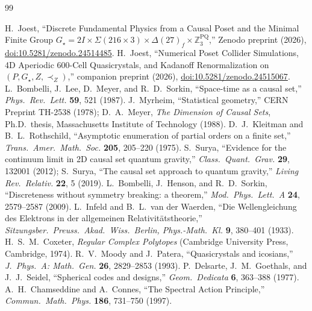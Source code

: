 \documentclass[11pt,a4paper]{article}
\theoremstyle{definition}
\theoremstyle{remark}
\newcommand{\Z}{\mathbb{Z}}
\begin{document}
\begin{thebibliography}{99}\raggedright
{} H.~Joest, ``Discrete Fundamental Physics from a Causal Poset and the Minimal Finite Group $G_\star = 2I \times \Sigma(216 \times 3) \times \Delta(27)_f \times \Z_3^{\mathrm{PQ}}$,'' Zenodo preprint (2026), \href{https://doi.org/10.5281/zenodo.24514485}{doi:10.5281/zenodo.24514485}.
 H.~Joest, ``Numerical Poset Collider Simulations, 4D Aperiodic $600$-Cell Quasicrystals, and Kadanoff Renormalization on $(P, G_\star, Z, \prec_Z)$,'' companion preprint (2026), \href{https://doi.org/10.5281/zenodo.24515067}{doi:10.5281/zenodo.24515067}.
 L.~Bombelli, J.~Lee, D.~Meyer, and R.~D.~Sorkin, ``Space-time as a causal set,'' \emph{Phys.\ Rev.\ Lett.} \textbf{59}, 521 (1987).
 J.~Myrheim, ``Statistical geometry,'' CERN Preprint TH-2538 (1978); D.~A.~Meyer, \emph{The Dimension of Causal Sets}, Ph.D.\ thesis, Massachusetts Institute of Technology (1988).
 D.~J.~Kleitman and B.~L.~Rothschild, ``Asymptotic enumeration of partial orders on a finite set,'' \emph{Trans.\ Amer.\ Math.\ Soc.} \textbf{205}, 205--220 (1975).
 S.~Surya, ``Evidence for the continuum limit in 2D causal set quantum gravity,'' \emph{Class.\ Quant.\ Grav.} \textbf{29}, 132001 (2012); S.~Surya, ``The causal set approach to quantum gravity,'' \emph{Living Rev.\ Relativ.} \textbf{22}, 5 (2019).
 L.~Bombelli, J.~Henson, and R.~D.~Sorkin, ``Discreteness without symmetry breaking: a theorem,'' \emph{Mod.\ Phys.\ Lett.\ A} \textbf{24}, 2579--2587 (2009).
 L.~Infeld and B.~L.~van der Waerden, ``Die Wellengleichung des Elektrons in der allgemeinen Relativit\"atstheorie,'' \emph{Sitzungsber.\ Preuss.\ Akad.\ Wiss.\ Berlin, Phys.-Math.\ Kl.} \textbf{9}, 380--401 (1933).
 H.~S.~M.~Coxeter, \emph{Regular Complex Polytopes} (Cambridge University Press, Cambridge, 1974).
 R.~V.~Moody and J.~Patera, ``Quasicrystals and icosians,'' \emph{J.\ Phys.\ A: Math.\ Gen.} \textbf{26}, 2829--2853 (1993).
 P.~Delsarte, J.~M.~Goethals, and J.~J.~Seidel, ``Spherical codes and designs,'' \emph{Geom.\ Dedicata} \textbf{6}, 363--388 (1977).
 A.~H.~Chamseddine and A.~Connes, ``The Spectral Action Principle,'' \emph{Commun.\ Math.\ Phys.} \textbf{186}, 731--750 (1997).
\end{thebibliography}
\end{document}
